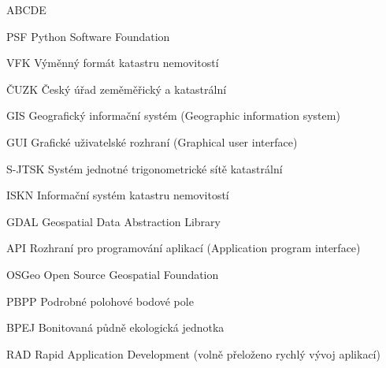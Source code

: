 
\begin{seznamzkratek}{ABCDE}

		  {PSF}
	      {Python Software Foundation}
	      
		  {VFK}
	      {Výměnný formát katastru nemovitostí}
	      
	      {ČUZK}
	      {Český úřad zeměměřický a katastrální}

	      {GIS}
	      {Geografický informační systém (Geographic information system)}
	         
	      {GUI}
	      {Grafické uživatelské rozhraní (Graphical user interface)}
	           
	      {S-JTSK}
	      {Systém jednotné trigonometrické sítě katastrální}
	  
	      {ISKN}
	      {Informační systém katastru nemovitostí}        
	      
	      {GDAL}
	      {Geospatial Data Abstraction Library}
	      
	      {API}
	      {Rozhraní pro programování aplikací (Application program interface)}    
	      
	      {OSGeo}
	      {Open Source Geospatial Foundation}
	      
	      {PBPP}
	      {Podrobné polohové bodové pole}

	      {BPEJ}
	      {Bonitovaná půdně ekologická jednotka}
	      
	      {RAD}
	      {Rapid Application Development (volně přeloženo rychlý vývoj aplikací)}
	        
\end{seznamzkratek}
